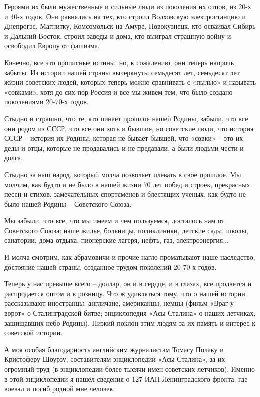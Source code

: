 Героями их были мужественные и сильные люди из поколения их отцов, из 20-х и
40-х годов.  Они равнялись на тех, кто строил Волховскую электростанцию и
Днепрогэс, Магнитку, Комсомольск-на-Амуре, Новокузнецк, кто осваивал Сибирь и
Дальний Восток, строил заводы и дома, кто выиграл страшную войну и освободил
Европу от фашизма.

Конечно, все это прописные истины, но, к сожалению, они теперь напрочь забыты.
Из истории нашей страны вычеркнуты семьдесят лет, семьдесят лет жизни советских
людей, которых теперь можно сравнивать с «пылью» и называть «совками», хотя до
сих пор Россия и все мы живем тем, что было создано поколениями 20-70-х годов.

Стыдно и страшно, что те, кто пинает прошлое нашей Родины, забыли, что все они
родом из СССР, что все они хоть и бывшие, но советские люди, что история СССР –
история их Родины, которая не бывает бывшей, что «совки» – это их деды и отцы,
которые не продавались и не предавали, а были людьми чести и долга.

Стыдно за наш народ, который молча позволяет плевать в свое прошлое. Мы молчим,
как будто и не было в нашей жизни 70 лет побед и строек, прекрасных песен и
стихов, замечательных спортсменов и блестящих ученых, как будто не было нашей
Родины – Советского Союза.

Мы забыли, что все, что мы имеем и чем пользуемся, досталось нам от Советского
Союза: наше жилье, больницы, поликлиники, детские сады, школы, санатории, дома
отдыха, пионерские лагеря, нефть, газ, электроэнергия...

И молча смотрим, как абрамовичи и прочие нагло проматывают наше наследство,
достояние нашей страны, созданное трудом поколений 20-70-х годов.

Теперь у нас превыше всего – доллар, он и в сердце, и в глазах, все продается и
распродается оптом и в розницу. Что ж удивляться тому, что о нашей истории
рассказывают иностранцы: англичане, американцы, немцы (фильм «Враг у ворот» о
Сталинградской битве; энциклопедия «Асы Сталина» о наших летчиках, защищавших
небо Родины). Низкий поклон этим людям за их память и интерес к советской
истории.

А моя особая благодарность английским журналистам Томасу Полаку и Кристоферу
Шоурзу, составителям энциклопедии «Асы Сталина», за их огромный труд (в
энциклопедии более тысячи имен советских летчиков). Именно в этой энциклопедии
я нашёл сведения о 127 ИАП Ленинградского фронта, где воевал и погиб родной мне
человек.

